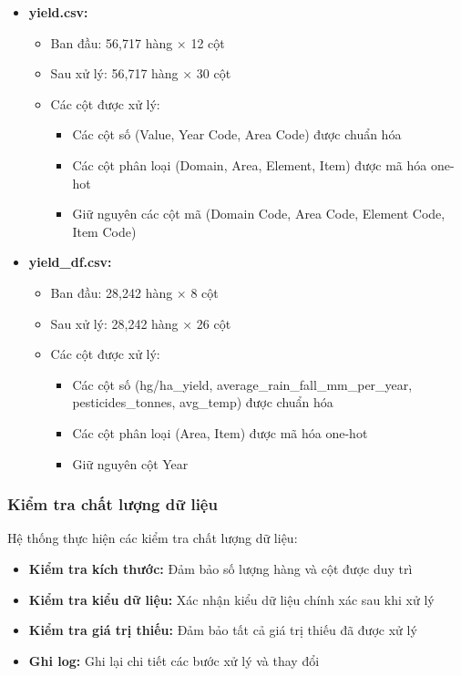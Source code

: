 \begin{itemize}
    \item \textbf{yield.csv:}
    \begin{itemize}
        \item Ban đầu: 56,717 hàng × 12 cột
        \item Sau xử lý: 56,717 hàng × 30 cột
        \item Các cột được xử lý:
        \begin{itemize}
            \item Các cột số (Value, Year Code, Area Code) được chuẩn hóa
            \item Các cột phân loại (Domain, Area, Element, Item) được mã hóa one-hot
            \item Giữ nguyên các cột mã (Domain Code, Area Code, Element Code, Item Code)
        \end{itemize}
    \end{itemize}
    
    \item \textbf{yield\_df.csv:}
    \begin{itemize}
        \item Ban đầu: 28,242 hàng × 8 cột
        \item Sau xử lý: 28,242 hàng × 26 cột
        \item Các cột được xử lý:
        \begin{itemize}
            \item Các cột số (hg/ha\_yield, average\_rain\_fall\_mm\_per\_year, pesticides\_tonnes, avg\_temp) được chuẩn hóa
            \item Các cột phân loại (Area, Item) được mã hóa one-hot
            \item Giữ nguyên cột Year
        \end{itemize}
    \end{itemize}
\end{itemize}

\subsubsection{Kiểm tra chất lượng dữ liệu}

\hspace{0.5cm}Hệ thống thực hiện các kiểm tra chất lượng dữ liệu:

\begin{itemize}
    \item \textbf{Kiểm tra kích thước:} Đảm bảo số lượng hàng và cột được duy trì
    \item \textbf{Kiểm tra kiểu dữ liệu:} Xác nhận kiểu dữ liệu chính xác sau khi xử lý
    \item \textbf{Kiểm tra giá trị thiếu:} Đảm bảo tất cả giá trị thiếu đã được xử lý
    \item \textbf{Ghi log:} Ghi lại chi tiết các bước xử lý và thay đổi
\end{itemize}

